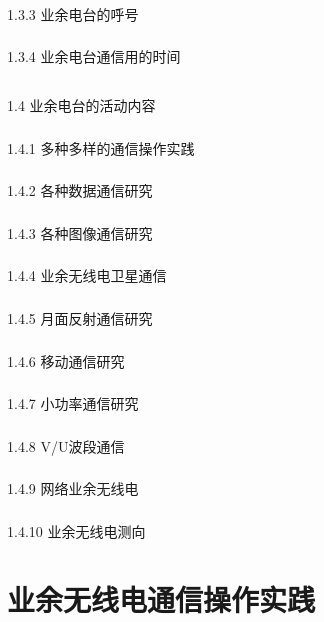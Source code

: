 \documentclass[12pt,UTF8]{ctexbook}
\begin{document}
\subsection{}1.3.3 业余电台的呼号
\subsection{}1.3.4 业余电台通信用的时间
\section{}1.4 业余电台的活动内容
\subsection{}1.4.1 多种多样的通信操作实践
\subsection{}1.4.2 各种数据通信研究
\subsection{}1.4.3 各种图像通信研究
\subsection{}1.4.4 业余无线电卫星通信
\subsection{}1.4.5 月面反射通信研究
\subsection{}1.4.6 移动通信研究
\subsection{}1.4.7 小功率通信研究
\subsection{}1.4.8 V/U波段通信
\subsection{}1.4.9 网络业余无线电
\subsection{}1.4.10 业余无线电测向

\chapter{业余无线电通信操作实践}
\end{document}
